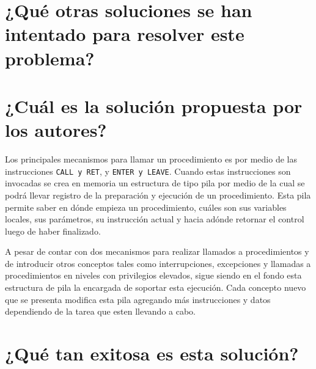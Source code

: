 \section{¿Qué otras soluciones se han intentado para resolver este problema?}
     
\section{¿Cuál es la solución propuesta por los autores?}
Los principales mecanismos para llamar un procedimiento es por medio de las instrucciones \texttt{CALL \textnormal{y} RET}, y \texttt{ENTER \textnormal{y} LEAVE}. Cuando estas instrucciones son invocadas se crea en memoria un estructura de tipo pila por medio de la cual se podrá llevar registro de la preparación y ejecución de un procedimiento. Esta pila permite saber en dónde empieza un procedimiento, cuáles son sus variables locales, sus parámetros, su instrucción actual y hacia adónde retornar el control luego de haber finalizado.

A pesar de contar con dos mecanismos para realizar llamados a procedimientos y de introducir otros conceptos tales como interrupciones, excepciones y llamadas a procedimientos en niveles con privilegios elevados, sigue siendo en el fondo esta estructura de pila la encargada de soportar esta ejecución. Cada concepto nuevo que se presenta modifica esta pila agregando más instrucciones y datos dependiendo de la tarea que esten llevando a cabo.

\section{¿Qué tan exitosa es esta solución?} 
























